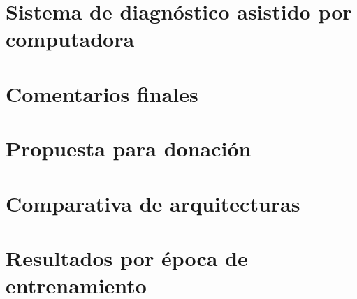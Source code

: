 \documentclass[11pt,twoside,letterpaper]{report}
\begin{document}
\chapter{Sistema de diagnóstico asistido por computadora}


\chapter{Comentarios finales}


\appendix
\chapter{Propuesta para donación}
\label{appendix:grant}


\chapter{Comparativa de arquitecturas}
\label{appendix:comparativa}


\chapter{Resultados por época de entrenamiento}
\label{appendix:entrenamiento}

\printbibliography
\end{document}
